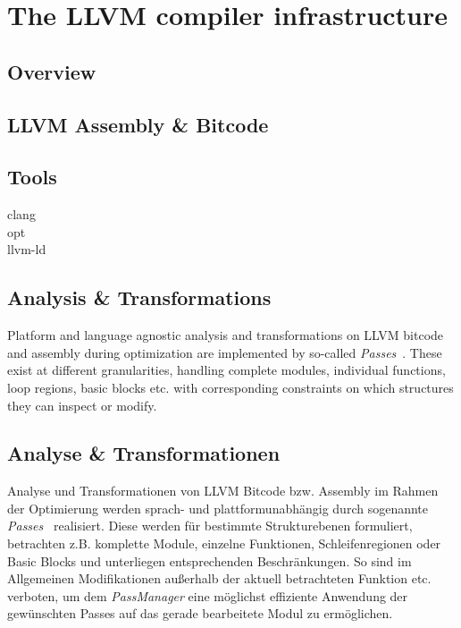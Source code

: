 \section{The LLVM compiler infrastructure}

\subsection{Overview}

\subsection{LLVM Assembly \& Bitcode}


\subsection{Tools}



\begin{description}
    \item[clang] 
    \item[opt] 
    \item[llvm-ld] 
\end{description}

\subsection{Analysis \& Transformations}

Platform and language agnostic analysis and transformations on LLVM bitcode and
assembly during optimization are implemented by so-called
\emph{Passes}~\cite{llvm-passes}. These exist at different granularities,
handling complete modules, individual functions, loop regions, basic blocks
etc. with corresponding constraints on which structures they can inspect or
modify.

\subsection{Analyse \& Transformationen}

Analyse und Transformationen von LLVM Bitcode bzw. Assembly im Rahmen der
Optimierung werden sprach- und plattformunabhängig durch sogenannte
\emph{Passes}~\cite{llvm-passes} realisiert. Diese werden für bestimmte
Strukturebenen formuliert, betrachten z.B. komplette Module, einzelne
Funktionen, Schleifenregionen oder Basic Blocks und unterliegen entsprechenden
Beschränkungen. So sind im Allgemeinen Modifikationen außerhalb der aktuell
betrachteten Funktion etc.  verboten, um dem \emph{PassManager} eine möglichst
effiziente Anwendung der gewünschten Passes auf das gerade bearbeitete Modul zu
ermöglichen.

